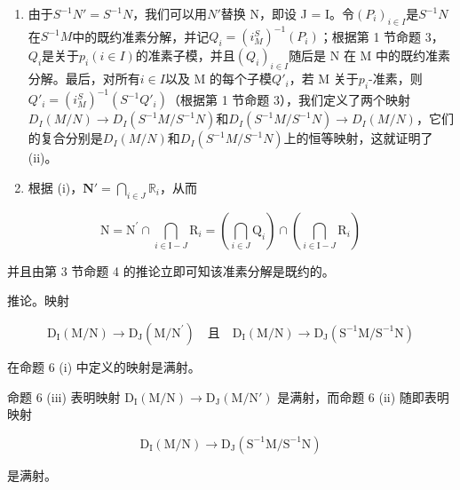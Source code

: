 \begin{enumerate}
\item
   由于\(S^{-1}N' = S^{-1}N\)，我们可以用\(N'\)替换 N，即设 J = I。令\((P_i)_{i \in I}\)是\(S^{-1}N\)在\(S^{-1}M\)中的既约准素分解，并记\(Q_i = (i_M^S)^{-1}(P_i)\)；根据第 1 节命题 3，\(Q_i\)是关于\(p_i (i \in I)\)的准素子模，并且\((Q_i)_{i \in I}\)随后是 N 在 M 中的既约准素分解。最后，对所有\(i \in I\)以及 M 的每个子模\(Q'_i\)，若 M 关于\(p_i\)-准素，则\(Q'_i = (i_M^S)^{-1}(S^{-1}Q'_i)\)（根据第 1 节命题 3），我们定义了两个映射\(D_I(M/N) \to D_I(S^{-1}M/S^{-1}N)\)和\(D_I(S^{-1}M/S^{-1}N) \to D_I(M/N)\)，它们的复合分别是\(D_I(M/N)\)和\(D_I(S^{-1}M/S^{-1}N)\)上的恒等映射，这就证明了 (ii)。
\item
  根据 (i)，\(\mathbf{N}' = \bigcap_{i\in J}\mathbb{R}_i\)，从而
\end{enumerate}

\[
\mathrm{N} = \mathrm{N} ^ {\prime} \cap \bigcap_ {i \in \mathrm{I} - J} \mathrm{R} _ {i} = \left(\bigcap_ {i \in J} \mathrm{Q} _ {i}\right) \cap \left(\bigcap_ {i \in \mathrm{I} - J} \mathrm{R} _ {i}\right)
\]

并且由第 3 节命题 4 的推论立即可知该准素分解是既约的。

推论。映射

\[
\mathrm{D} _ {\mathrm{I}} (\mathrm{M} / \mathrm{N}) \rightarrow \mathrm{D} _ {\mathrm{J}} (\mathrm{M} / \mathrm{N} ^ {\prime}) \quad \text{且} \quad \mathrm{D} _ {\mathrm{I}} (\mathrm{M} / \mathrm{N}) \rightarrow \mathrm{D} _ {\mathrm{J}} (\mathrm{S} ^ {- 1} \mathrm{M} / \mathrm{S} ^ {- 1} \mathrm{N})
\]

在命题 6 (i) 中定义的映射是满射。

命题 6 (iii) 表明映射 \(\mathrm{D}_{\mathrm{I}}(\mathrm{M}/\mathrm{N}) \rightarrow \mathrm{D}_{\mathrm{J}}(\mathrm{M}/\mathrm{N}')\) 是满射，而命题 6 (ii) 随即表明映射

\[
\mathrm{D} _ {\mathrm{I}} (\mathrm{M} / \mathrm{N}) \rightarrow \mathrm{D} _ {\mathrm{J}} (\mathrm{S} ^ {- 1} \mathrm{M} / \mathrm{S} ^ {- 1} \mathrm{N})
\]

是满射。

